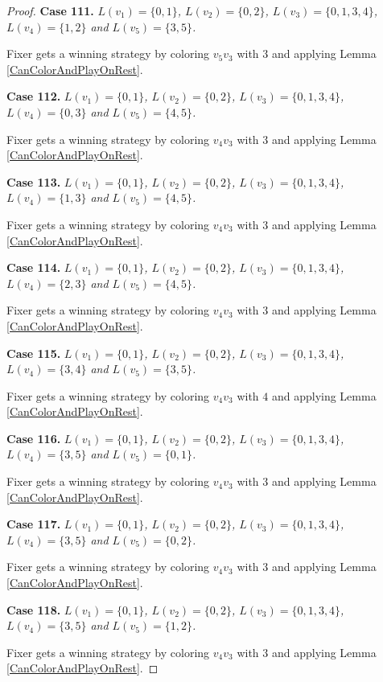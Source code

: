 \documentclass[12pt]{amsart}
\theoremstyle{plain}
\theoremstyle{definition}
\theoremstyle{remark}
\begin{document}
\begin{proof}
\noindent\textbf{Case 111.  }\textit{$L(v_1) = \{0, 1\}$, $L(v_2) = \{0, 2\}$, $L(v_3) = \{0, 1, 3, 4\}$, $L(v_4) = \{1, 2\}$ and $L(v_5) = \{3, 5\}$.}

Fixer gets a winning strategy by coloring $v_5v_3$ with $3$ and applying Lemma \ref{CanColorAndPlayOnRest}.

\noindent\textbf{Case 112.  }\textit{$L(v_1) = \{0, 1\}$, $L(v_2) = \{0, 2\}$, $L(v_3) = \{0, 1, 3, 4\}$, $L(v_4) = \{0, 3\}$ and $L(v_5) = \{4, 5\}$.}

Fixer gets a winning strategy by coloring $v_4v_3$ with $3$ and applying Lemma \ref{CanColorAndPlayOnRest}.

\noindent\textbf{Case 113.  }\textit{$L(v_1) = \{0, 1\}$, $L(v_2) = \{0, 2\}$, $L(v_3) = \{0, 1, 3, 4\}$, $L(v_4) = \{1, 3\}$ and $L(v_5) = \{4, 5\}$.}

Fixer gets a winning strategy by coloring $v_4v_3$ with $3$ and applying Lemma \ref{CanColorAndPlayOnRest}.

\noindent\textbf{Case 114.  }\textit{$L(v_1) = \{0, 1\}$, $L(v_2) = \{0, 2\}$, $L(v_3) = \{0, 1, 3, 4\}$, $L(v_4) = \{2, 3\}$ and $L(v_5) = \{4, 5\}$.}

Fixer gets a winning strategy by coloring $v_4v_3$ with $3$ and applying Lemma \ref{CanColorAndPlayOnRest}.

\noindent\textbf{Case 115.  }\textit{$L(v_1) = \{0, 1\}$, $L(v_2) = \{0, 2\}$, $L(v_3) = \{0, 1, 3, 4\}$, $L(v_4) = \{3, 4\}$ and $L(v_5) = \{3, 5\}$.}

Fixer gets a winning strategy by coloring $v_4v_3$ with $4$ and applying Lemma \ref{CanColorAndPlayOnRest}.

\noindent\textbf{Case 116.  }\textit{$L(v_1) = \{0, 1\}$, $L(v_2) = \{0, 2\}$, $L(v_3) = \{0, 1, 3, 4\}$, $L(v_4) = \{3, 5\}$ and $L(v_5) = \{0, 1\}$.}

Fixer gets a winning strategy by coloring $v_4v_3$ with $3$ and applying Lemma \ref{CanColorAndPlayOnRest}.

\noindent\textbf{Case 117.  }\textit{$L(v_1) = \{0, 1\}$, $L(v_2) = \{0, 2\}$, $L(v_3) = \{0, 1, 3, 4\}$, $L(v_4) = \{3, 5\}$ and $L(v_5) = \{0, 2\}$.}

Fixer gets a winning strategy by coloring $v_4v_3$ with $3$ and applying Lemma \ref{CanColorAndPlayOnRest}.

\noindent\textbf{Case 118.  }\textit{$L(v_1) = \{0, 1\}$, $L(v_2) = \{0, 2\}$, $L(v_3) = \{0, 1, 3, 4\}$, $L(v_4) = \{3, 5\}$ and $L(v_5) = \{1, 2\}$.}

Fixer gets a winning strategy by coloring $v_4v_3$ with $3$ and applying Lemma \ref{CanColorAndPlayOnRest}.


\end{proof}
\end{document}
